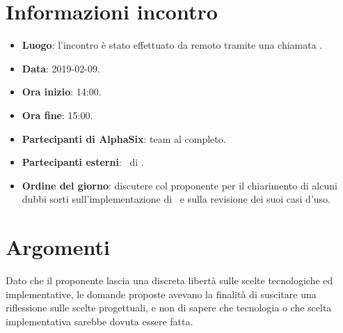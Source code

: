 \newcommand{\documento}{\VE}
\newcommand{\nomedocumentofisico}{VE\_2019-02-09.pdf}
\newcommand{\redazione}{\TG}
\newcommand{\verifica}{\SG}
\newcommand{\approvazione}{\CV}
\newcommand{\versione}{1.0.0}
\newcommand{\uso}{Esterno}
\newcommand{\destinateTo}{\TV, \\ & \RC, \\ & \II}
\newcommand{\datacreazione}{09 febbraio 2019}
\newcommand{\datamodifica}{11 febbraio 2019}
\newcommand{\stato}{Approvato}

\def\TABELLE{false}	%
\def\FIGURE{false} 	%






    

    
    
    \section{Informazioni incontro}
    	\begin{itemize}
    		\item \textbf{Luogo}: l'incontro è stato effettuato da remoto tramite una chiamata .
    		\item \textbf{Data}: 2019-02-09.
    		\item \textbf{Ora inizio}: 14:00.
    		\item \textbf{Ora fine}: 15:00.
    		\item \textbf{Partecipanti di AlphaSix}: team al completo.
    		\item \textbf{Partecipanti esterni}: \DZ~di \II.
    		\item \textbf{Ordine del giorno}: discutere col proponente per il chiarimento di alcuni dubbi sorti sull'implementazione di \progetto~e sulla revisione dei suoi casi d'uso.
    	\end{itemize}
    
    \section{Argomenti}
    	Dato che il proponente lascia una discreta libertà sulle scelte tecnologiche ed implementative, le domande proposte avevano la finalità di suscitare una riflessione sulle scelte progettuali, e non di sapere che tecnologia o che scelta implementativa sarebbe dovuta essere fatta.
    	
